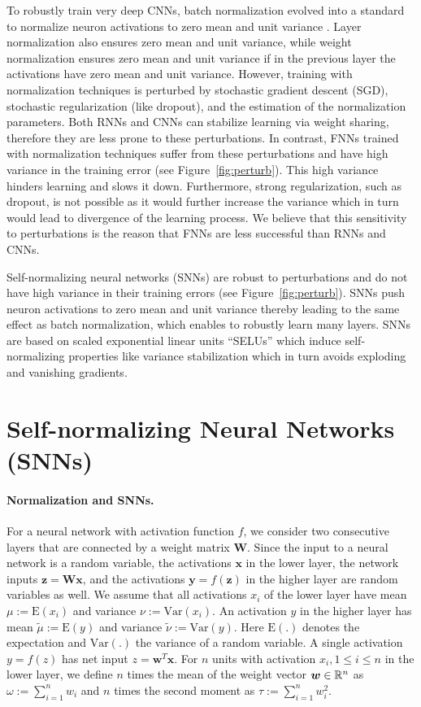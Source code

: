 \documentclass{article}
\newcommand\Bw{\bm{w}}
\newcommand\Bx{\bm{x}}
\newcommand\By{\bm{y}}
\newcommand\Bz{\bm{z}}
\newcommand\BW{\bm{W}}
\newcommand\EXP{\mathbf{\mathrm{E}}}
\newcommand\VAR{\mathbf{\mathrm{Var}}}
\newcommand\munn{{\tilde \mu}}
\newcommand\nunn{{\tilde \nu}}
\renewcommand{\leq}{\leqslant}
\begin{document}
To robustly train very deep CNNs, batch normalization evolved into a standard to normalize
neuron activations to zero mean and unit variance \citep{bib:Ioffe2015}. 
Layer normalization \citep{bib:Ba2016} also ensures zero mean and unit
variance, while weight normalization \citep{bib:Salimans2016} ensures
zero mean and unit variance if in the previous layer the activations have
zero mean and unit variance.
However, training with normalization techniques is perturbed by
stochastic gradient descent (SGD), stochastic
regularization (like dropout), 
and the estimation of the normalization parameters.
Both RNNs and CNNs can stabilize learning via weight sharing, 
therefore they are less prone to these perturbations. 
In contrast, FNNs trained with normalization techniques suffer from
these perturbations and have high variance 
in the training error (see Figure~\ref{fig:perturb}). 
This high variance hinders learning and slows it down. 
Furthermore, strong regularization, such as dropout, 
is not possible as it would further 
increase the variance which in turn would lead to divergence of  the
learning process.
We believe that this sensitivity to perturbations 
is the reason that FNNs are less
successful than RNNs and CNNs.

Self-normalizing neural networks (SNNs) are robust to perturbations
and do not have high variance in their training errors (see Figure~\ref{fig:perturb}).
SNNs push neuron activations to zero mean and unit variance 
thereby leading to the same effect as batch normalization,
which enables to robustly learn many layers. 
SNNs are based on scaled exponential linear units ``SELUs''
which induce self-normalizing properties like variance stabilization
which in turn avoids exploding and vanishing gradients.


\section*{Self-normalizing Neural Networks (SNNs)}
\paragraph{Normalization and SNNs.}
For a neural network with activation function $f$, 
we consider two consecutive layers 
that are connected by a weight matrix $\BW$.
Since the input to a neural
network is a random variable, 
the activations $\Bx$ in the lower
layer, the network inputs $\Bz=\BW \Bx$, and the 
activations $\By=f(\Bz)$ in the higher layer are
random variables as well. 
We assume that all activations $x_i$ of the lower layer
have mean 
$\mu:=\EXP(x_i)$ and variance $\nu:=\VAR(x_i)$. 
An activation $y$ in the
higher layer has mean
$\munn:=\EXP(y)$ and variance
$\nunn:=\VAR(y)$. 
Here $\EXP(.)$ denotes the expectation and
$\VAR(.)$ the variance of a random variable.
A single activation $y=f(z)$ has net input 
$z=\Bw^T \Bx$. 
For $n$ units with activation 
$x_i, 1\leq i \leq n$ in the lower layer, we define $n$  
times the mean of the 
weight vector $\Bw \in \dR^n$ as $\omega:=\sum_{i=1}^n  w_i$ and $n$
times the second moment as $\tau:=\sum_{i=1}^n  w_i^2$.
\end{document}
